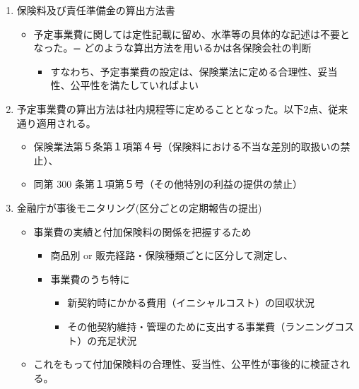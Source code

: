 \documentclass[]{article}
\begin{document}
\begin{enumerate}
\def\labelenumi{\arabic{enumi}.}
\tightlist
\item
  保険料及び責任準備金の算出方法書

  \begin{itemize}
  \tightlist
  \item
    予定事業費に関しては定性記載に留め、水準等の具体的な記述は不要となった。=
    どのような算出方法を用いるかは各保険会社の判断

    \begin{itemize}
    \tightlist
    \item
      すなわち、予定事業費の設定は、保険業法に定める合理性、妥当性、公平性を満たしていればよい
    \end{itemize}
  \end{itemize}
\item
  予定事業費の算出方法は社内規程等に定めることとなった。以下2点、従来通り適用される。

  \begin{itemize}
  \tightlist
  \item
    保険業法第５条第１項第４号（保険料における不当な差別的取扱いの禁止）、
  \item
    同第 300 条第１項第５号（その他特別の利益の提供の禁止）
  \end{itemize}
\item
  金融庁が事後モニタリング(区分ごとの定期報告の提出)

  \begin{itemize}
  \tightlist
  \item
    事業費の実績と付加保険料の関係を把握するため

    \begin{itemize}
    \tightlist
    \item
      商品別 or 販売経路・保険種類ごとに区分して測定し、
    \item
      事業費のうち特に

      \begin{itemize}
      \tightlist
      \item
        新契約時にかかる費用（イニシャルコスト）の回収状況
      \item
        その他契約維持・管理のために支出する事業費（ランニングコスト）の充足状況
      \end{itemize}
    \end{itemize}
  \item
    これをもって付加保険料の合理性、妥当性、公平性が事後的に検証される。
  \end{itemize}
\end{enumerate}
\end{document}
